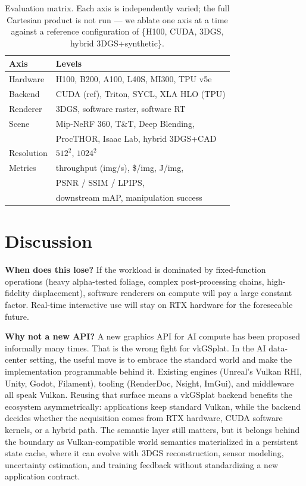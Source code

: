\documentclass[10pt,journal,onecolumn]{IEEEtran}
\begin{document}
\begin{table}[t]
\centering
\caption{Evaluation matrix. Each axis is independently varied; the
full Cartesian product is not run --- we ablate one axis at a time
against a reference configuration of \{H100, CUDA, 3DGS,
hybrid 3DGS+synthetic\}.}
\label{tab:eval}
\small
\begin{tabular}{@{}ll@{}}
\toprule
\textbf{Axis} & \textbf{Levels} \\
\midrule
Hardware  & H100, B200, A100, L40S, MI300, TPU v5e \\
Backend   & CUDA (ref), Triton, SYCL, XLA HLO (TPU) \\
Renderer  & 3DGS, software raster, software RT \\
Scene     & Mip-NeRF 360, T\&T, Deep Blending,\\
          & ProcTHOR, Isaac Lab, hybrid 3DGS+CAD \\
Resolution & $512^2$, $1024^2$ \\
\midrule
Metrics   & throughput (img/s), \$/img, J/img, \\
          & PSNR / SSIM / LPIPS, \\
          & downstream mAP, manipulation success \\
\bottomrule
\end{tabular}
\end{table}

\section{Discussion}

\textbf{When does this lose?} If the workload is dominated by
fixed-function operations (heavy alpha-tested foliage, complex
post-processing chains, high-fidelity displacement), software renderers
on compute will pay a large constant factor. Real-time interactive use
will stay on RTX hardware for the foreseeable future.

\textbf{Why not a new API?} A new graphics API for AI compute has
been proposed informally many times. That is the wrong fight for vkGSplat. In
the AI data-center setting, the useful move is to embrace the standard world
and make the implementation programmable behind it. Existing engines (Unreal's
Vulkan RHI, Unity, Godot, Filament), tooling (RenderDoc, Nsight, ImGui), and
middleware all speak Vulkan. Reusing that surface means a vkGSplat backend
benefits the ecosystem asymmetrically: applications keep standard Vulkan, while
the backend decides whether the acquisition comes from RTX hardware, CUDA
software kernels, or a hybrid path. The semantic layer still matters, but it
belongs behind the boundary as Vulkan-compatible world semantics materialized in
a persistent state cache, where it can evolve with 3DGS reconstruction, sensor
modeling, uncertainty estimation, and training feedback without standardizing a
new application contract.
\end{document}
